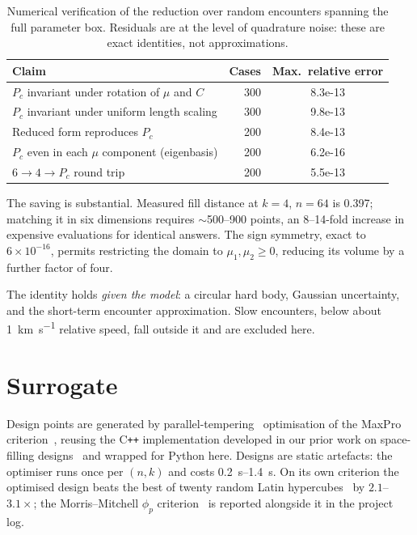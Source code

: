 \documentclass[11pt]{article}
\newcommand{\Pc}{P_c}
\begin{document}
\begin{table}[htbp]
\centering
\caption{Numerical verification of the reduction over random encounters
         spanning the full parameter box. Residuals are at the level of
         quadrature noise: these are exact identities, not approximations.}
\label{tab:invariance}
\begin{tabular}{lrS[table-format=1.1e-2]}
\toprule
Claim & {Cases} & {Max.\ relative error} \\
\midrule
$\Pc$ invariant under rotation of $\mu$ and $C$ & 300 & 8.3e-13 \\
$\Pc$ invariant under uniform length scaling    & 300 & 9.8e-13 \\
Reduced form reproduces $\Pc$                   & 200 & 8.4e-13 \\
$\Pc$ even in each $\mu$ component (eigenbasis) & 200 & 6.2e-16 \\
$6 \to 4 \to \Pc$ round trip                    & 200 & 5.5e-13 \\
\bottomrule
\end{tabular}
\end{table}

The saving is substantial. Measured fill distance at $k=4$, $n=64$ is
\num{0.397}; matching it in six dimensions requires
$\sim$\numrange{500}{900} points, an \numrange{8}{14}-fold increase in
expensive evaluations for identical answers. The sign symmetry, exact to
$6\times10^{-16}$, permits restricting the domain to
$\mu_1, \mu_2 \ge 0$, reducing its volume by a further factor of four.

The identity holds \emph{given the model}: a circular hard body, Gaussian
uncertainty, and the short-term encounter approximation. Slow encounters,
below about \SI{1}{\kilo\meter\per\second} relative speed, fall outside it
and are excluded here.

\section{Surrogate}\label{sec:surrogate}

Design points are generated by parallel-tempering~\cite{geyer} optimisation
of the MaxPro criterion~\cite{joseph}, reusing the C\texttt{++}
implementation developed in our prior work on space-filling
designs~\cite{rusis} and wrapped for Python here. Designs are static artefacts: the
optimiser runs once per $(n, k)$ and costs \SIrange{0.2}{1.4}{\second}. On
its own criterion the optimised design beats the best of twenty random Latin
hypercubes~\cite{mckay} by $2.1$--$3.1\times$; the Morris--Mitchell $\phi_p$
criterion~\cite{morris} is reported alongside it in the project log.
\end{document}
